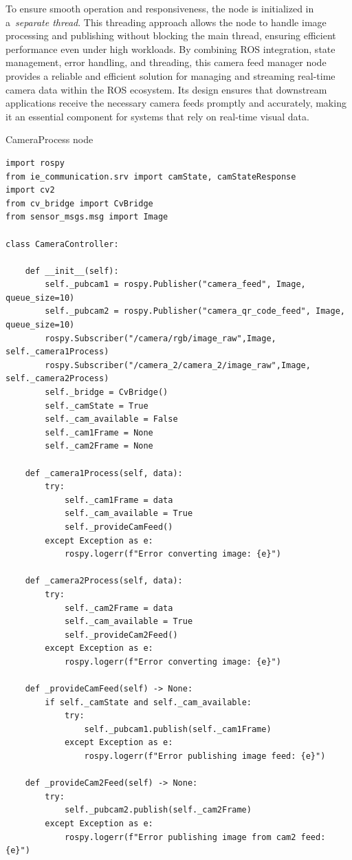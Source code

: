 \documentclass[../../main]{subfiles}
\begin{document}
To ensure smooth operation and responsiveness, the node is initialized
in a~\emph{separate thread}. This threading approach allows the node to
handle image processing and publishing without blocking the main thread,
ensuring efficient performance even under high workloads. By combining
ROS integration, state management, error handling, and threading, this
camera feed manager node provides a reliable and efficient solution for
managing and streaming real-time camera data within the ROS ecosystem.
Its design ensures that downstream applications receive the necessary
camera feeds promptly and accurately, making it an essential component
for systems that rely on real-time visual data.
\begin{codebox}[label=judFig22]{CameraProcess node}
\begin{verbatim}
import rospy
from ie_communication.srv import camState, camStateResponse
import cv2
from cv_bridge import CvBridge
from sensor_msgs.msg import Image

class CameraController:

    def __init__(self):
        self._pubcam1 = rospy.Publisher("camera_feed", Image, queue_size=10)
        self._pubcam2 = rospy.Publisher("camera_qr_code_feed", Image, queue_size=10)
        rospy.Subscriber("/camera/rgb/image_raw",Image, self._camera1Process)
        rospy.Subscriber("/camera_2/camera_2/image_raw",Image, self._camera2Process)
        self._bridge = CvBridge()
        self._camState = True
        self._cam_available = False
        self._cam1Frame = None
        self._cam2Frame = None

    def _camera1Process(self, data):
        try:
            self._cam1Frame = data
            self._cam_available = True
            self._provideCamFeed()
        except Exception as e:
            rospy.logerr(f"Error converting image: {e}")

    def _camera2Process(self, data):
        try:
            self._cam2Frame = data
            self._cam_available = True
            self._provideCam2Feed()
        except Exception as e:
            rospy.logerr(f"Error converting image: {e}")

    def _provideCamFeed(self) -> None:
        if self._camState and self._cam_available:
            try:
                self._pubcam1.publish(self._cam1Frame)
            except Exception as e:
                rospy.logerr(f"Error publishing image feed: {e}")

    def _provideCam2Feed(self) -> None:
        try:
            self._pubcam2.publish(self._cam2Frame)
        except Exception as e:
            rospy.logerr(f"Error publishing image from cam2 feed: {e}")
\end{verbatim}
\end{codebox}
\end{document}

